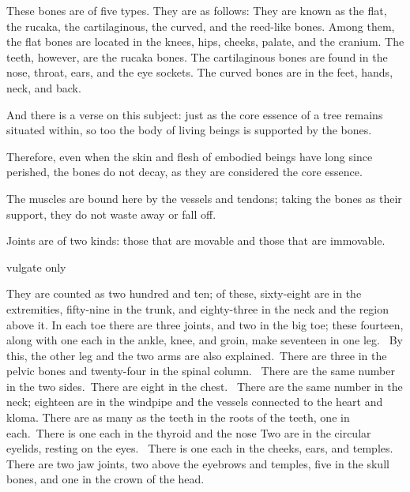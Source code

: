 \begin{translation}
\item[20]
These bones are of five types. They are as follows: They are known as the flat, the rucaka, the cartilaginous, the curved, and the reed-like bones. Among them, the flat bones are located in the knees, hips, cheeks, palate, and the cranium.  The teeth, however, are the rucaka bones. The cartilaginous bones are found in the nose, throat, ears, and the eye sockets. The curved bones are in the feet, hands, neck, and back. 

\item[21]
And there is a verse on this subject: just as the core essence of a tree remains situated within, so too the body of living beings is supported by the bones. 

\item[22]
Therefore, even when the skin and flesh of embodied beings have long since perished, the bones do not decay, as they are considered the core essence. 

\item[23]
The muscles are bound here by the vessels and tendons; taking the bones as their support, they do not waste away or fall off. 

\item[24]
Joints are of two kinds: those that are movable and those that are immovable. 
\item[25]   vulgate only

\item[26]
They are counted as two hundred and ten; of these, sixty-eight are in the extremities, fifty-nine in the trunk, and eighty-three in the neck and the region above it. In each toe there are three joints, and two in the big toe; these fourteen, along with one each in the ankle, knee, and groin, make seventeen in one leg.  By this, the other leg and the two arms are also explained. There are three in the pelvic bones and twenty-four in the spinal column.  There are the same number in the two sides. There are eight in the chest.  There are the same number in the neck; eighteen are in the windpipe and the vessels connected to the heart and kloma. There are as many as the teeth in the roots of the teeth, one in each. There is one each in the thyroid and the nose Two are in the circular eyelids, resting on the eyes. 
There is one each in the cheeks, ears, and temples.  There are two jaw joints, two above the eyebrows and temples, five in the skull bones, and one in the crown of the head. 


\end{translation}
